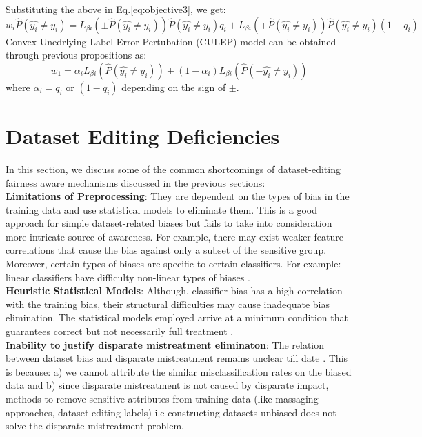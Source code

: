 \documentclass[runningheads]{llncs}
\begin{document}
Substituting the above in Eq.\ref{eq:objective3}, we get:
\begin{equation}	
w_i\hat{P}(\hat{y_i} \neq y_i) = L_{\beta i}(\pm \hat{P}(\hat{y_i} \neq y_i))\hat{P}(\hat{y_i} \neq y_i)q_i + L_{\beta i}(\mp \hat{P}(\hat{y_i} \neq y_i))\hat{P}(\hat{y_i} \neq y_i)(1-q_i)	
\label{lipschitzweight}				    
\end{equation}
Convex Unedrlying Label Error Pertubation (CULEP) model can be obtained through previous propositions as:
\begin{equation}
w_1 = \alpha_i  L_{\beta i}(\hat{P}(\hat{y_i} \neq y_i)) + (1 - \alpha_i)  L_{\beta i}(\hat{P}(- \hat{y_i} \neq y_i))
\label{finalequation}
\end{equation}
where $\alpha_i = q_i$ or $(1 - q_i)$ depending on the sign of $\pm$.
\section{Dataset Editing Deficiencies}
In this section, we discuss some of the common shortcomings of dataset-editing fairness aware mechanisms discussed in the previous sections:\\
\textbf{Limitations of Preprocessing}: They are dependent on the types of bias in the training data and use statistical models to eliminate them. This is a good approach for simple dataset-related biases but fails to take into consideration more intricate source of awareness. For example, there may exist weaker feature correlations \cite{calders2013controlling} that cause the bias against only a subset of the sensitive group. Moreover, certain types of biases are specific to certain classifiers. For example: linear classifiers have difficulty non-linear types of biases \cite{krasanakis2018adaptive}.\\
\textbf{Heuristic Statistical Models}: Although, classifier bias has a high correlation with the training bias, their structural difficulties may cause inadequate bias elimination. The statistical models employed arrive at a minimum condition that guarantees correct but not necessarily full treatment \cite{krasanakis2018adaptive}.\\
\textbf{Inability to justify disparate mistreatment eliminaton}: The relation between dataset bias and disparate mistreatment remains unclear till date \cite{krasanakis2018adaptive}. This is because: a) we cannot attribute the similar misclassification rates on the biased data and b) since disparate mistreatment is not caused by disparate impact, methods to remove sensitive attributes from training data (like massaging approaches, dataset editing labels) i.e constructing datasets unbiased does not solve the disparate mistreatment problem.
\end{document}
